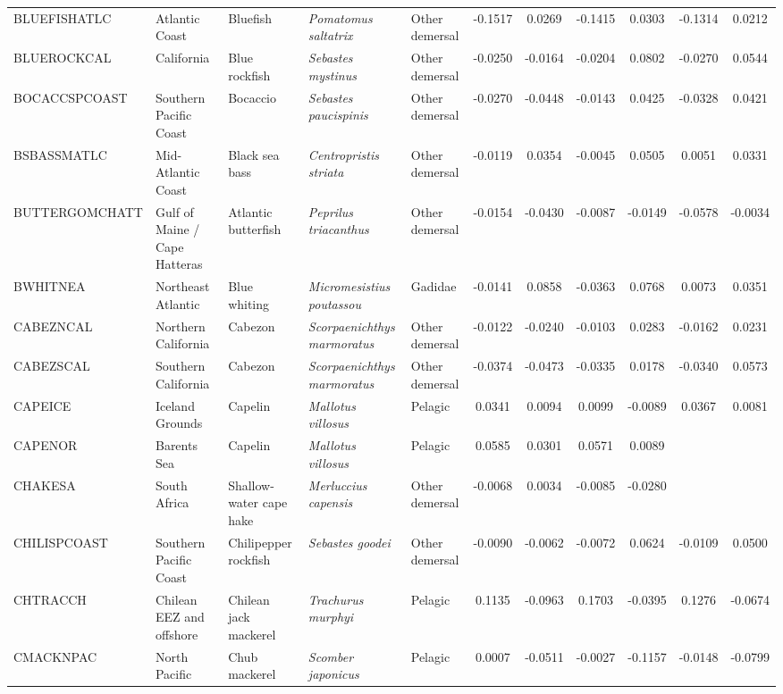 \begin{longtable}{p{3cm}p{3cm}lllcccccc}
  BLUEFISHATLC & Atlantic Coast & Bluefish & \textit{Pomatomus saltatrix} & Other demersal & -0.1517 & 0.0269 & -0.1415 & 0.0303 & -0.1314 & 0.0212 \\
  BLUEROCKCAL & California & Blue rockfish & \textit{Sebastes mystinus} & Other demersal & -0.0250 & -0.0164 & -0.0204 & 0.0802 & -0.0270 & 0.0544 \\
  BOCACCSPCOAST & Southern Pacific Coast & Bocaccio & \textit{Sebastes paucispinis} & Other demersal & -0.0270 & -0.0448 & -0.0143 & 0.0425 & -0.0328 & 0.0421 \\
  BSBASSMATLC & Mid-Atlantic Coast & Black sea bass & \textit{Centropristis striata} & Other demersal & -0.0119 & 0.0354 & -0.0045 & 0.0505 & 0.0051 & 0.0331 \\
  BUTTERGOMCHATT & Gulf of Maine / Cape Hatteras & Atlantic butterfish & \textit{Peprilus triacanthus} & Other demersal & -0.0154 & -0.0430 & -0.0087 & -0.0149 & -0.0578 & -0.0034 \\
  BWHITNEA & Northeast Atlantic & Blue whiting & \textit{Micromesistius poutassou} & Gadidae & -0.0141 & 0.0858 & -0.0363 & 0.0768 & 0.0073 & 0.0351 \\
  CABEZNCAL & Northern California & Cabezon & \textit{Scorpaenichthys marmoratus} & Other demersal & -0.0122 & -0.0240 & -0.0103 & 0.0283 & -0.0162 & 0.0231 \\
  CABEZSCAL & Southern California & Cabezon & \textit{Scorpaenichthys marmoratus} & Other demersal & -0.0374 & -0.0473 & -0.0335 & 0.0178 & -0.0340 & 0.0573 \\
  CAPEICE & Iceland Grounds & Capelin & \textit{Mallotus villosus} & Pelagic & 0.0341 & 0.0094 & 0.0099 & -0.0089 & 0.0367 & 0.0081 \\
  CAPENOR & Barents Sea & Capelin & \textit{Mallotus villosus} & Pelagic & 0.0585 & 0.0301 & 0.0571 & 0.0089 &  &  \\
  CHAKESA & South Africa & Shallow-water cape hake & \textit{Merluccius capensis} & Other demersal & -0.0068 & 0.0034 & -0.0085 & -0.0280 &  &  \\
  CHILISPCOAST & Southern Pacific Coast & Chilipepper rockfish & \textit{Sebastes goodei} & Other demersal & -0.0090 & -0.0062 & -0.0072 & 0.0624 & -0.0109 & 0.0500 \\
  CHTRACCH & Chilean EEZ and offshore & Chilean jack mackerel & \textit{Trachurus murphyi} & Pelagic & 0.1135 & -0.0963 & 0.1703 & -0.0395 & 0.1276 & -0.0674 \\
  CMACKNPAC & North Pacific & Chub mackerel & \textit{Scomber japonicus} & Pelagic & 0.0007 & -0.0511 & -0.0027 & -0.1157 & -0.0148 & -0.0799 \\

\end{longtable}
